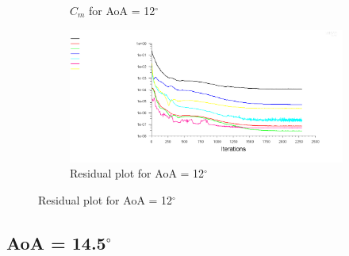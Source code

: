 \begin{figure}[H]
\begin{subfigure}[b]{0.5\textwidth}
    \caption{$C_m$ for AoA = 12$^\circ$}
    \label{fig:aoa_12_cm}
  \end{subfigure}
  \begin{subfigure}[b]{0.5\textwidth}
    \includegraphics[width=\textwidth]{12_deg/AoA_12_resid.png}
    \caption{Residual plot for AoA = 12$^\circ$}
    \label{fig:aoa_12_resid}
  \end{subfigure}
\end{figure}

\subsection*{AoA = 14.5$^\circ$}

